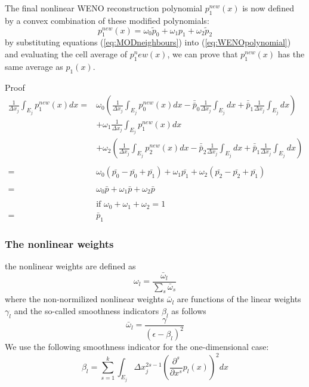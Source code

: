 \begin{frame}
	The final nonlinear WENO reconstruction polynomial $p_1^{new}(x)$ is now defined by a convex combination of these modified polynomials:
	\begin{equation}
	p_1^{new}(x) = \omega_0 \tilde{p}_0 + \omega_1 p_1 + \omega_2 \tilde{p}_2
	\label{eq:WENOpolynomial}
	\end{equation}
	by substituting equations (\ref{eq:MODneighbours}) into (\ref{eq:WENOpolynomial}) and evaluating the cell average of $p_1^new(x)$, we can prove that $p_1^{new}(x)$ has the same average as $p_1(x)$.
\end{frame}

\begin{frame}
	\begin{block}{Proof}
		\begin{align*}
		\frac{1}{\Delta x_j}\int_{E_j} p_1^{new} (x)dx =& 
		\omega_0 \left( \frac{1}{\Delta x_j}\int_{E_j} p_0^{new} (x)dx 
		-\bar{\bar{p}}_0 \frac{1}{\Delta x_j}\int_{E_j}dx
		+\bar{\bar{p}}_1 \frac{1}{\Delta x_j}\int_{E_j}dx \right) \\
		&+\omega_1 \frac{1}{\Delta x_j}\int_{E_j} p_1^{new} (x)dx \\ 
		&+\omega_2 \left(\frac{1}{\Delta x_j}\int_{E_j} p_2^{new} (x)dx 
		-\bar{\bar{p}}_2 \frac{1}{\Delta x_j}\int_{E_j}dx
		+\bar{\bar{p}}_1 \frac{1}{\Delta x_j}\int_{E_j}dx \right)\\
		\\
		=& \omega_0 \left( \bar{p_0}-\bar{p_0}+\bar{p_1} \right)
		+\omega_1 \bar{p_1}
		+\omega_2 \left( \bar{p_2}-\bar{p_2}+\bar{p_1} \right)\\
		\\
		=& \omega_0 \bar{p} + \omega_1 \bar{p} + \omega_2 \bar{p} \\
		\\
		&\text{if $\omega_0+\omega_1+\omega_2=1$}\\
		=& \bar{p}_1
	\end{align*}	
	\end{block}
\end{frame}

\begin{frame} \frametitle{The nonlinear weights}
	the nonlinear weights are defined as
	\begin{equation}
		\omega_l= \frac{\bar{\omega}_l}{\sum_s \bar{\omega}_s}	
	\end{equation}
	where the non-normilized nonlinear weights $\bar{\omega}_l$ are functions of the linear weights $\gamma_l$ and the so-called smoothness indicators $\beta_l$ as follows
	\begin{equation}
		\bar{\omega}_l = \frac{\gamma}{(\epsilon-\beta_l)^2}
	\end{equation}
We use the following smoothness indicator for the one-dimensional case:
	\begin{equation}
	\beta_l = \sum_{s=1}^k \int_{E_j} \Delta x_j^{2s-1}\left(\frac{\partial^s}{\partial x^s} p_l(x)\right)^2 dx
	\end{equation}
\end{frame}